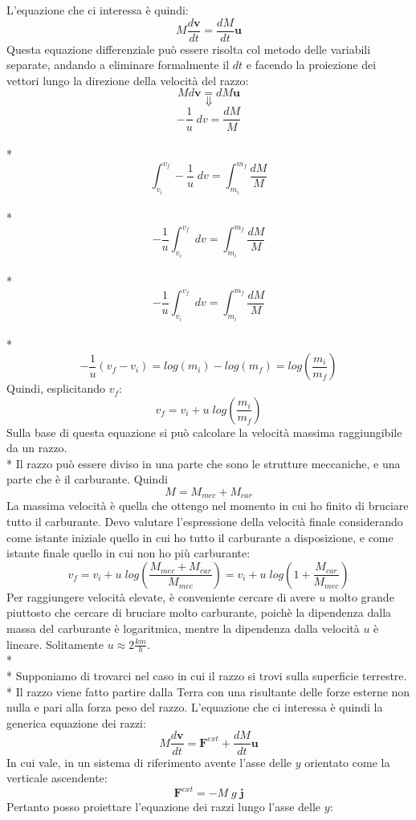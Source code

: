 \documentclass[10pt,a4paper]{book}
\begin{document}
L'equazione che ci interessa è quindi:
$$
M\frac{d\mathbf{v}}{dt} =  \frac{dM}{dt}\mathbf{u}
$$
Questa equazione differenziale può essere risolta col metodo delle variabili separate, andando a eliminare formalmente il $dt$ e facendo la proiezione dei vettori lungo la direzione della velocità del razzo:
$$
M{d\mathbf{v}} =  {dM}\mathbf{u}
$$
$$
\Downarrow
$$
$$
-\frac{1}{u}\;d{v} = \frac{dM}{M}
$$
\\*
$$
\int_{v_i}^{v_f}-\frac{1}{u}\;d{v} = \int_{m_i}^{m_f}\frac{dM}{M}
$$
\\*
$$
-\frac{1}{u}\int_{v_i}^{v_f}\;d{v} = \int_{m_i}^{m_f}\frac{dM}{M}
$$
\\*
$$
-\frac{1}{u}\int_{v_i}^{v_f}\;d{v} = \int_{m_i}^{m_f}\frac{dM}{M}
$$
\\*
$$
-\frac{1}{u}(v_f - v_i) = log(m_i) - log(m_f) = log\left(\frac{m_i}{m_f}\right)
$$
Quindi, esplicitando $v_f$:
$$
v_f = v_i + u\; log\left(\frac{m_i}{m_f}\right)
$$
Sulla base di questa equazione si può calcolare la velocità massima raggiungibile da un razzo.\\*
Il razzo può essere diviso in una parte che sono le strutture meccaniche, e una parte che è il carburante. Quindi
$$
M = M_{mec} + M_{car}
$$
La massima velocità è quella che ottengo nel momento in cui ho finito di bruciare tutto il carburante. Devo valutare l'espressione della velocità finale considerando come istante iniziale quello in cui ho tutto il carburante a disposizione, e come istante finale quello in cui non ho più carburante:
$$
v_f = v_i + u\;log\left( \frac{M_{mec} + M_{car}}{M_{mec}} \right) = v_i + u \;log \left( 1 + \frac{M_{car}}{M_{mec}}\right)
$$
Per raggiungere velocità elevate, è conveniente cercare di avere $u$ molto grande piuttosto che cercare di bruciare molto carburante, poichè la dipendenza dalla massa del carburante è logaritmica, mentre la dipendenza dalla velocità $u$ è lineare. Solitamente $u \approx 2 \frac{km}{h}$.\\*
\\*
Supponiamo di trovarci nel caso in cui il razzo si trovi sulla superficie terrestre.\\*
Il razzo viene fatto partire dalla Terra con una risultante delle forze esterne non nulla e pari alla forza peso del razzo. L'equazione che ci interessa è quindi la generica equazione dei razzi:
$$
M\frac{d\mathbf{v}}{dt} = \mathbf{F}^{ext} + \frac{dM}{dt}\mathbf{u}
$$
In cui vale, in un sistema di riferimento avente l'asse delle $y$ orientato come la verticale ascendente:
$$
\mathbf{F}^{ext} = -M\;g\;\mathbf{j}
$$
Pertanto posso proiettare l'equazione dei razzi lungo l'asse delle $y$:
\end{document}
